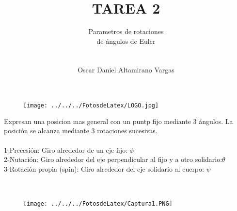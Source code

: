 \documentclass[12pt]{article}
\title{TAREA 2}
\author{Parametros de rotaciones \\ de ángulos de Euler\\ \\ \\ Oscar Daniel Altamirano Vargas\\}
\begin{document}
 
\maketitle
\begin{figure}[hbtp]
\caption{}
\centering
\texttt{[image: ../../../FotosdeLatex/LOGO.jpg]}
\end{figure}
\pagebreak

Expresan una posicion mas general con un puntp fijo mediante 3 ángulos. La posición se alcanza mediante 3 rotaciones sucesivas. \\ \\
1-Precesión: Giro alrededor de un eje fijo: $\phi$ \\
2-Nutación: Giro alrededor del eje perpendicular al fijo y a otro solidario:$\theta$ \\
3-Rotación propia (spin): Giro alrededor del eje solidario al cuerpo: $\psi$ \\ \\ \\
\begin{figure}[hbtp]
\caption{}
\centering
\texttt{[image: ../../../FotosdeLatex/Captura1.PNG]}
\end{figure}

\pagebreak
\end{document}
